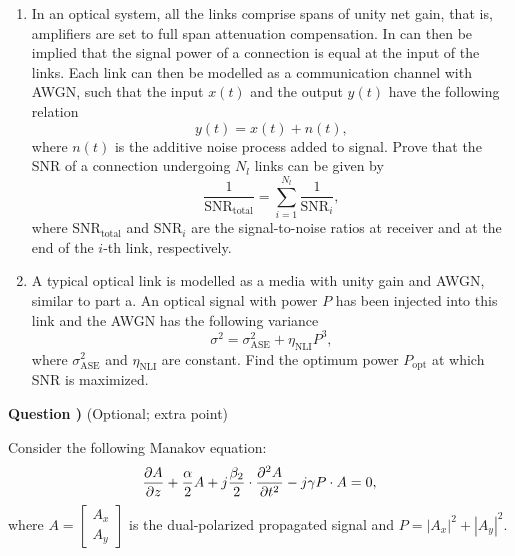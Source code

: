 \documentclass[10pt,letterpaper]{article}
\newcounter{questionnumber}
\newcommand{\Q}{
\textbf{Question \thequestionnumber)}
\stepcounter{questionnumber}
}
\begin{document}
\begin{enumerate}[label=\alph*-]
\item
In an optical system, all the links comprise spans of unity net gain, that is, amplifiers are set to full span attenuation compensation. In can then be implied that the signal power of a connection is equal at the input of the links. Each link can then be modelled as a communication channel with AWGN, such that the input $x(t)$ and the output $y(t)$ have the following relation
$$
y(t)=x(t)+n(t),
$$
where $n(t)$ is the additive noise process added to signal. Prove that the SNR of a connection undergoing $N_l$ links can be given by
$$
\frac{1}{\text{SNR}_\text{total}}=\sum_{i=1}^{N_l}
\frac{1}{\text{SNR}_i},
$$
where $\text{SNR}_\text{total}$ and $\text{SNR}_i$ are the signal-to-noise ratios at receiver and at the end of the $i$-th link, respectively.
\item
A typical optical link is modelled as a media with unity gain and AWGN, similar to part a. An optical signal with power $P$ has been injected into this link and the AWGN has the following variance $$\sigma^2=\sigma^2_\text{ASE}+\eta_\text{NLI}P^3,$$ where $\sigma^2_\text{ASE}$ and $\eta_\text{NLI}$ are constant. Find the optimum power $P_\text{opt}$ at which SNR is maximized.
\end{enumerate}

\Q (Optional; extra point)

Consider the following Manakov equation:
$$
{\partial A\over \partial z}+{\alpha\over 2}A+j{\beta_2\over 2}\cdot{\partial^2 A\over \partial t^2}-j\gamma P\cdot A=0
,
$$
where $A=\begin{bmatrix}A_x\\A_y\end{bmatrix}$ is the dual-polarized propagated signal and $P=|A_x|^2+|A_y|^2$.
\end{document}
